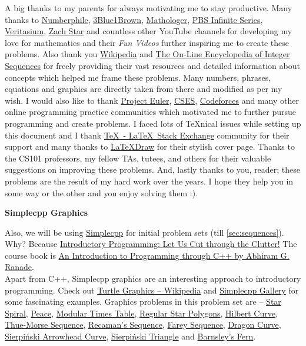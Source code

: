 \documentclass[../Problems]{subfiles}
\begin{document}
A big thanks to my parents for always motivating me to stay productive. Many thanks to \href{https://www.youtube.com/@numberphile}{Numberphile}, \href{https://www.youtube.com/@3blue1brown}{3Blue1Brown}, \href{https://www.youtube.com/@Mathologer}{Mathologer}, \href{https://www.youtube.com/@pbsinfiniteseries}{PBS Infinite Series}, \href{https://www.youtube.com/@veritasium}{Veritasium}, \href{https://www.youtube.com/@zachstar}{Zach Star} and countless other YouTube channels for developing my love for mathematics and their \emph{Fun Videos} further inspiring me to create these problems. Also thank you \href{https://en.wikipedia.org/wiki/Main_Page}{Wikipedia} and \href{http://oeis.org/}{The On-Line Encyclopedia of Integer Sequences} for freely providing their vast resources and detailed information about concepts which helped me frame these problems. Many numbers, phrases, equations and graphics are directly taken from there and modified as per my wish. I would also like to thank \href{https://projecteuler.net/}{Project Euler}, \href{https://cses.fi/problemset}{CSES}, \href{https://codeforces.com/}{Codeforces} and many other online programming practice communities which motivated me to further pursue programming and create problems. I faced lots of \TeX nical issues while setting up this document and I thank \href{tex.stackexchange.com}{\TeX\ - \LaTeX\ Stack Exchange} community for their support and many thanks to \href{https://latexdraw.com/tikz-cover-pages-gallery/}{\LaTeX Draw} for their stylish cover page. Thanks to the CS101 professors, my fellow TAs, tutees, and others for their valuable suggestions on improving these problems. And, lastly thanks to you, reader; these problems are the result of my hard work over the years. I hope they help you in some way or the other and you enjoy solving them :).
\begin{center}
	\textbf{\Large{Simplecpp Graphics}}
\end{center}
Also, we will be using \href{https://www.cse.iitb.ac.in/~ranade/simplecpp/}{Simplecpp} for initial problem sets (till \ref{sec:sequences}).
Why? Because \href{https://www.cse.iitb.ac.in/~ranade/iticse16.pdf}{Introductory Programming: Let Us Cut through the Clutter!} The course book is \href{https://www.cse.iitb.ac.in/~ranade/book.html}{An Introduction to Programming through C++ by Abhiram G. Ranade}.\\
Apart from C++, Simplecpp graphics are an interesting approach to introductory programming. Check out \href{https://en.wikipedia.org/wiki/Turtle_graphics}{Turtle Graphics -- Wikipedia} and \href{https://www.cse.iitb.ac.in/~ranade/simplecpp/gallery.html}{Simplecpp Gallery} for some fascinating examples. Graphics problems in this problem set are -- \hyperref[pp:starspiral]{Star Spiral}, \hyperref[pp:peace]{Peace}, \hyperref[pp:timestable]{Modular Times Table}, \hyperref[pp:regularstarpolygon]{Regular Star Polygons}, \hyperref[pp:hilbertcurve]{Hilbert Curve}, \hyperref[pp:thuemorsesequence]{Thue-Morse Sequence}, \hyperref[pp:recamanssequence]{Recaman's Sequence}, \hyperref[pp:fareysequence]{Farey Sequence}, \hyperref[pp:dragoncurve]{Dragon Curve}, \hyperref[pp:sierpinskicurve]{Sierpi\'nski Arrowhead Curve}, \hyperref[pp:sierpinskitriangle]{Sierpi\'nski Triangle} and \hyperref[pp:barnsleyfern]{Barnsley's Fern}. %
\end{document}
